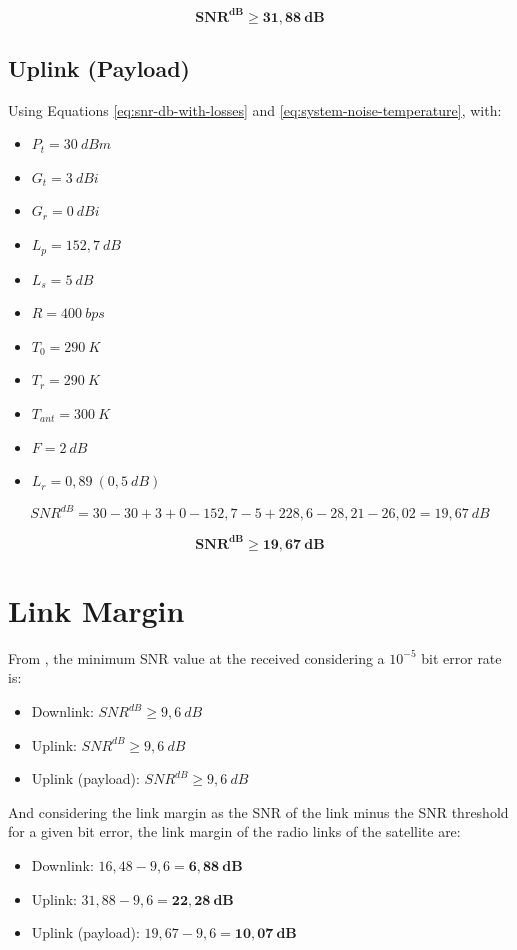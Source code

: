 \begin{equation}
    \mathbf{SNR^{dB} \geq 31,88\ dB}
\end{equation}

\subsection{Uplink (Payload)}

Using Equations \ref{eq:snr-db-with-losses} and \ref{eq:system-noise-temperature}, with:

\begin{itemize}
    \item $P_{t} = 30\ dBm$
    \item $G_{t} = 3\ dBi$
    \item $G_{r} = 0\ dBi$
    \item $L_{p} = 152,7\ dB$
    \item $L_{s} = 5\ dB$
    \item $R = 400\ bps$
    \item $T_{0} = 290\ K$
    \item $T_{r} = 290\ K$
    \item $T_{ant} = 300\ K$
    \item $F = 2\ dB$
    \item $L_{r} = 0,89\ (0,5\ dB)$
\end{itemize}

\begin{equation}
    SNR^{dB} = 30 - 30 + 3 + 0 - 152,7 - 5 + 228,6 - 28,21 - 26,02 = 19,67\ dB
\end{equation}

\begin{equation}
    \mathbf{SNR^{dB} \geq 19,67\ dB}
\end{equation}

\section{Link Margin}

From \cite{larson2005}, the minimum SNR value at the received considering a $10^{-5}$ bit error rate is:

\begin{itemize}
    \item Downlink: $SNR^{dB} \geq 9,6\ dB$
    \item Uplink: $SNR^{dB} \geq 9,6\ dB$
    \item Uplink (payload): $SNR^{dB} \geq 9,6\ dB$
\end{itemize}

And considering the link margin as the SNR of the link minus the SNR threshold for a given bit error, the link margin of the radio links of the satellite are:

\begin{itemize}
    \item Downlink: $16,48 - 9,6 = \mathbf{6,88\ dB}$
    \item Uplink: $31,88 - 9,6 = \mathbf{22,28\ dB}$
    \item Uplink (payload): $19,67 - 9,6 = \mathbf{10,07\ dB}$
\end{itemize}
